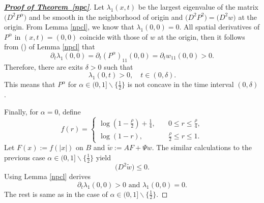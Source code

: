 \documentclass[10pt]{article}         %
\numberwithin{equation}{section}
\begin{document}
\begin{proof}[\textbf{\emph{\underline{Proof of Theorem~\ref{npc}}}}]
Let $\lambda_1(x,t)$ be the largest eigenvalue of the matrix $\big(D^2 P^\alpha \big)$ and be smooth in the neighborhood of origin and $\big(D^2P^2\big)=\big(D^2 w\big)$ at the origin. From Lemma \ref{npcl}, we know that $\lambda_1(0,0)=0$. All spatial derivatives of $P^\alpha$ in $(x,t)=(0,0)$ coincide with those of $w$ at the origin, then it follows from (\expandafter{}) of Lemma \ref{npcl} that \[\partial_t\lambda_1(0,0)=\partial_t(P^\alpha)_{11}(0,0)=\partial_t w_{11}(0,0)>0.\] Therefore, there are exits $\delta>0$ such that
\[\lambda_1(0,t)>0,\quad t\in(0,\delta).\]
This  means that  $P^\alpha$ for $\alpha\in (0,1]\backslash\{\frac{1}{2}\}$ is not concave in the time interval $(0,\delta)$ .

Finally, for $\alpha=0$, define 
\begin{equation*}
    f(r)=\begin{cases}\log(1-\frac{\rho}{2})+\frac{1}{4},\quad&0\leq r\leq \frac{\rho}{4},\\
    \log(1-r),\quad &\frac{\rho}{2}\leq r\leq 1.
    \end{cases}
\end{equation*}
Let $F(x):=f(|x|)$ on $B$ and $\tilde{w}:=AF+\Psi w$. The similar calculations to the previous case $\alpha\in (0,1]\backslash\{\frac{1}{2}\}$ yield
\[\big(D^2\tilde{w}\big)\leq 0.\]
Using Lemma \ref{npcl} derives
\[\partial_t \lambda_1(0,0)>0 \text{ and }\lambda_1(0,0)=0.\]
The rest is same as in the case of $\alpha\in(0,1]\backslash\{\frac{1}{2}\}$.
\end{proof} 
\end{document}
